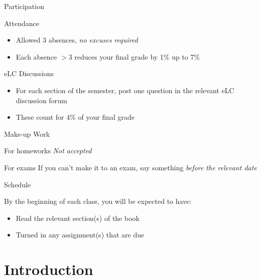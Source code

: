\documentclass{beamer}
\begin{document}
    \begin{frame}{Participation}
      \begin{block}{Attendance}
        \begin{itemize}
          \item Allowed 3 absences, \emph{no excuses required}
          \item Each absence $>$3 reduces your final grade by 1\% up to 7\%
        \end{itemize}
      \end{block}
      \begin{block}{eLC Discussions}
        \begin{itemize}
          \item For each section of the semester, post one question in the relevant eLC discussion forum
          \item These count for 4\% of your final grade
        \end{itemize}
      \end{block}
    \end{frame}

    \begin{frame}{Make-up Work}
      \begin{block}{For homeworks}
        \emph{Not accepted}
      \end{block}
      \begin{block}{For exams}
        If you can't make it to an exam, say something \emph{before the relevant date}
      \end{block}
    \end{frame}

    \begin{frame}{Schedule}
      \begin{block}{}
        By the beginning of each class, you will be expected to have:
        \begin{itemize}
          \item Read the relevant section(s) of the book
          \item Turned in any assignment(s) that are due
        \end{itemize}
      \end{block}
    \end{frame}

  \section{Introduction}
\end{document}
